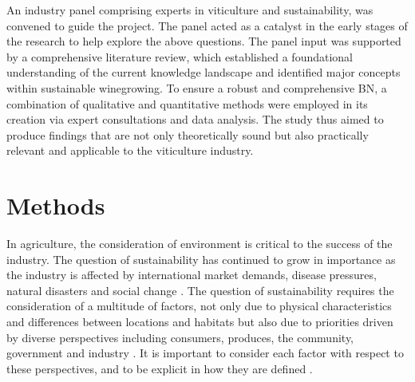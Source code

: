 An industry panel comprising experts in viticulture and sustainability, was convened to guide the project. The panel acted as a catalyst in the early stages of the research to help explore the above questions. The panel input was supported by a comprehensive literature review, which established a foundational understanding of the current knowledge landscape and identified major concepts within sustainable winegrowing. To ensure a robust and comprehensive BN, a combination of qualitative and quantitative methods were employed in its creation via expert consultations and data analysis. The study thus aimed to produce findings that are not only theoretically sound but also practically relevant and applicable to the viticulture industry.

\section{Methods}

In agriculture, the consideration of environment is critical to the success of the industry. The question of sustainability has continued to grow in importance as the industry is affected by international market demands, disease pressures, natural disasters and social change \citep{wineaustraliaNationalVintageReport2022,wineaustraliaNationalVintageReport2020,wineaustraliaNationalVintageReport2021,cassonMultidisciplinaryApproachAssess2022}. The question of sustainability requires the consideration of a multitude of factors, not only due to physical characteristics and differences between locations and habitats but also due to priorities driven by diverse perspectives including consumers, produces, the community, government and industry \citep{baianoOverviewSustainabilityWine2021,wayeCarbonFootprintsFood2008}. It is important to consider each factor with respect to these perspectives, and to be explicit in how they are defined \citep{santiago-brownSustainabilityAssessmentWineGrape2015}.

